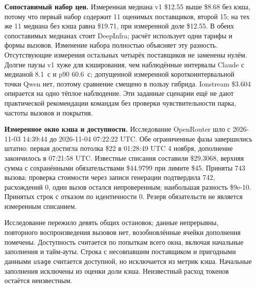 \textbf{Сопоставимый набор цен.} Измеренная медиана v1 \$12.55 выше \$8.68 без кэша,
потому что первый набор содержит 11 оценимых поставщиков, второй 15;
на тех же 11 медиана без кэша равна \$19.71, при измеренной доле \$12.55.
В обеих сопоставимых медианах стоит DeepInfra; расчёт использует одни тарифы и формы вызовов. Изменение набора полностью объясняет эту разность. Отсутствующие измерения остальных четырёх поставщиков не заменены нулём.
Долгие паузы v1 хуже для кэширования, чем наблюдённые интервалы Claude с медианой 8.1~с и p90 60.6~с;
допущенной измеренной короткоинтервальной точки Qwen нет, поэтому сравнение смещено в пользу гибрида.
Ionstream \$3.604 опирается на одно тёплое наблюдение. Эти заданные сценарии ещё не дают
практической рекомендации командам без проверки чувствительности парка, частоты вызовов и покрытия.

\textbf{Измеренное окно кэша и доступности.} Исследование OpenRouter шло
с 2026-11-03 14:39:44 до 2026-11-04 07:22:22 UTC. Обе ограниченные фазы завершились штатно:
первая достигла потолка \$22 в 01:28:49 UTC 4 ноября, дополнение закончилось в 07:21:58 UTC.
Известные списания составили \$29.3068, верхняя сумма с сохранёнными обязательствами \$44.9799 при лимите \$45.
Приняты 743 вызова; проверка стоимости через записи генерации подтвердила 742,
расхождений 0, один вызов остался непроверенным; наибольшая разность \$9e-10.
Принятых строк с отказом по идентичности 0. Резерв обязательств не является измеренным списанием.

Исследование пережило девять общих остановок; данные непрерывны, повторного воспроизведения вызовов нет,
возобновлённые ячейки дополнения помечены. Доступность считается по попыткам всего окна,
включая начальные заполнения и тайм-ауты. Строка с несовпавшим поставщиком и пригодными данными \texttt{usage}
считается доступной, но исключается из метрик кэша. Начальные заполнения исключены из оценки доли кэша. Неизвестный расход токенов остаётся неизвестным.

